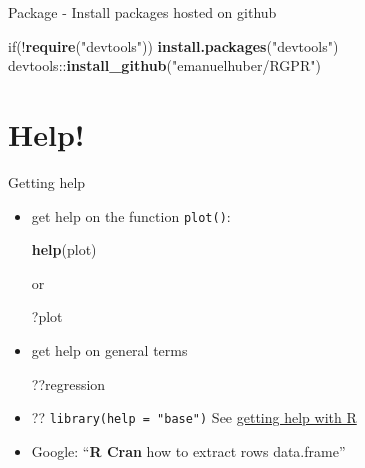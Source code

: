 \documentclass[8pt,ignorenonframetext,]{beamer}
\newenvironment{Shaded}{\begin{snugshade}}{\end{snugshade}}
\newcommand{\KeywordTok}[1]{\textcolor[rgb]{0.13,0.29,0.53}{\textbf{{#1}}}}
\newcommand{\StringTok}[1]{\textcolor[rgb]{0.31,0.60,0.02}{{#1}}}
\newcommand{\NormalTok}[1]{{#1}}
\begin{document}
\begin{frame}[fragile]{Package - Install packages hosted on github}

\begin{Shaded}
\begin{Highlighting}[]
\NormalTok{if(!}\KeywordTok{require}\NormalTok{(}\StringTok{"devtools"}\NormalTok{)) }\KeywordTok{install.packages}\NormalTok{(}\StringTok{"devtools"}\NormalTok{)}
\NormalTok{devtools::}\KeywordTok{install_github}\NormalTok{(}\StringTok{"emanuelhuber/RGPR"}\NormalTok{)}
\end{Highlighting}
\end{Shaded}

\end{frame}

\section{Help!}\label{help}

\begin{frame}[fragile]{Getting help}

\begin{itemize}
\item
  get help on the function \texttt{plot()}:

\begin{Shaded}
\begin{Highlighting}[]
\KeywordTok{help}\NormalTok{(plot)}
\end{Highlighting}
\end{Shaded}

  or

\begin{Shaded}
\begin{Highlighting}[]
\NormalTok{?plot}
\end{Highlighting}
\end{Shaded}
\item
  get help on general terms

\begin{Shaded}
\begin{Highlighting}[]
\NormalTok{??regression}
\end{Highlighting}
\end{Shaded}
\item
  ?? \texttt{library(help\ =\ "base")} See
  \href{https://www.r-project.org/help.html}{getting help with R}
\item
  Google: ``\textbf{R Cran} how to extract rows data.frame''
\end{itemize}

\end{frame}
\end{document}
